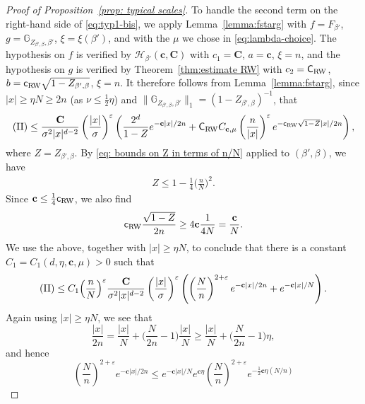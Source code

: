 \documentclass[11pt,a4paper]{article}
\numberwithin{equation}{section}
\theoremstyle{plain}
\theoremstyle{definition}
\newcommand\1{\mathds{1}}
\newcommand\bfc{\mathbf{c}}
\newcommand\bfC{\mathbf{C}}
\newcommand\Crw{\mathsf{C}_{\textup{RW}}}
\newcommand\crw{\mathsf{c}_{\textup{RW}}}
\begin{document}
\begin{proof}[Proof of Proposition~\textup{\ref{prop: typical scales}}]
To handle the second term on the right-hand side of \eqref{eq:typ1-bis}, we apply
Lemma~\ref{lemma:fstarg} with $f=F_{\beta'}$, $g=\mathbb G_{Z_{\beta',\beta},\beta'}$, $\xi=\xi(\beta')$, and with the $\mu$ we chose in \eqref{eq:lambda-choice}.
The hypothesis on $f$ is verified by
$\mathcal H_{\beta'}(\bfc,\bfC)$ with $c_1=\bfC$, $a=\bfc$, $\xi=n$, and the hypothesis
on $g$ is verified by Theorem~\ref{thm:estimate RW} with
$c_2=\Crw$, $b=\crw \sqrt{1-Z_{\beta',\beta}}$, $\xi=n$.
It therefore follows from Lemma~\ref{lemma:fstarg}, since $|x| \ge \eta N \ge 2n$
(as $\nu \le \frac 12 \eta$)
and $\|\mathbb G_{Z_{\beta',\beta},\beta'}\|_1 = (1-Z_{\beta',\beta})^{-1}$, that
\begin{align}
    ({\rm II}) \le
    \frac{\bfC}{\sigma^2|x|^{d-2}} \left(\frac{|x|}{\sigma}\right)^\varepsilon
    \left(
    \frac{2^{d}}{1-Z}   e^{-\bfc|x|/2n}
    +
    \Crw C_{\bfc,\mu}\left(\frac{n}{|x|}\right)^\varepsilon
    e^{-\crw\sqrt{1-Z}|x|/2n}
    \right),
\end{align}
where $Z=Z_{\beta',\beta}$. By  \eqref{eq: bounds on Z in terms of n/N} applied to $(\beta',\beta)$, we
have
 \begin{align}
 \label{eq: bound Z final proof}
   Z \le  1-\frac{1}{4}\Big( \frac nN \Big)^2.
 \end{align}
Since $\bfc\leq\frac{1}{4}\crw$, we also find
\begin{equation}
\label{eq:exponent-rescale}
    \crw \frac{\sqrt{1-Z}}{2n} \ge  4 \bfc \frac{1}{4N} = \frac{\bfc}{N}.
\end{equation}
We use the above, together with $|x| \ge \eta N$, to conclude that
there is a constant $C_1=C_1(d,\eta,\bfc,\mu)>0$ such that
\begin{align}
\label{eq:new2}
    ({\rm II}) \le
    C_1 \Big( \frac nN \Big)^\varepsilon
    \frac{\bfC}{\sigma^2|x|^{d-2}} \left(\frac{|x|}{\sigma}\right)^\varepsilon
    \left(
    \left( \frac Nn \right)^{2+\varepsilon}  e^{-\bfc|x|/2n}
    +
    e^{-\bfc|x|/N}
    \right).
\end{align}
Again using $|x| \ge \eta N$, we see that
\begin{equation}
    \frac{|x|}{2n} = \frac{|x|}{N} + \Big( \frac{N}{2n} - 1\Big) \frac{|x|}{N}
    \ge   \frac{|x|}{N} + \Big( \frac{N}{2n} - 1 \Big)\eta,
\end{equation}
and hence
\begin{equation}
\label{eq:new3}
    \left(\frac{N}{n}\right)^{2+\varepsilon}  e^{-  \bfc |x|/2n}
    \le e^{- \bfc |x|/N}
    e^{\bfc  \eta}  \left(\frac{N}{n}\right)^{2+\varepsilon} e^{-\frac 12 \bfc \eta(N/n)}

\end{equation}
\end{proof}
\end{document}
